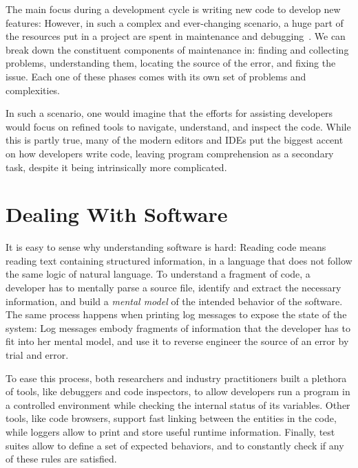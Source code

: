 The main focus during a development cycle is writing new code to develop new features: However, in such a complex and ever-changing scenario, a huge part of the resources put in a project are spent in maintenance and debugging~\cite{Corb1989,Fjel1983,Zelk1979,Mine2015b}.
We can break down the constituent components of maintenance in: finding and collecting problems, understanding them, locating the source of the error, and fixing the issue.
Each one of these phases comes with its own set of problems and complexities.

In such a scenario, one would imagine that the efforts for assisting developers would focus on refined tools to navigate, understand, and inspect the code.
While this is partly true, many of the modern editors and IDEs put the biggest accent on how developers write code, leaving program comprehension as a secondary task, despite it being intrinsically more complicated.


\section{Dealing With Software}

It is easy to sense why understanding software is hard: Reading code means reading text containing structured information, in a language that does not follow the same logic of natural language.
To understand a fragment of code, a developer has to mentally parse a source file, identify and extract the necessary information, and build a \emph{mental model} of the intended behavior of the software.
The same process happens when printing log messages to expose the state of the system: Log messages embody fragments of information that the developer has to fit into her mental model, and use it to reverse engineer the source of an error by trial and error.

To ease this process, both researchers and industry practitioners built a plethora of tools, like debuggers and code inspectors, to allow developers run a program in a controlled environment while checking the internal status of its variables.
Other tools, like code browsers, support fast linking between the entities in the code, while loggers allow to print and store useful runtime information.
Finally, test suites allow to define a set of expected behaviors, and to constantly check if any of these rules are satisfied.

